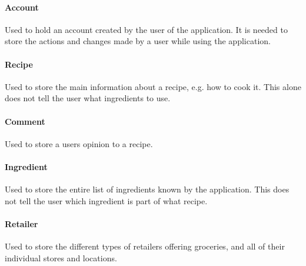 \paragraph{Account} Used to hold an account created by the user of the application. It is needed to store the actions and changes made by a user while using the application. 

\paragraph{Recipe} Used to store the main information about a recipe, e.g. how to cook it. This alone does not tell the user what ingredients to use.

\paragraph{Comment} Used to store a users opinion to a recipe.

\paragraph{Ingredient} Used to store the entire list of ingredients known by the application. This does not tell the user which ingredient is part of what recipe.

\paragraph{Retailer} Used to store the different types of retailers offering groceries, and all of their individual stores and locations.
\newline

